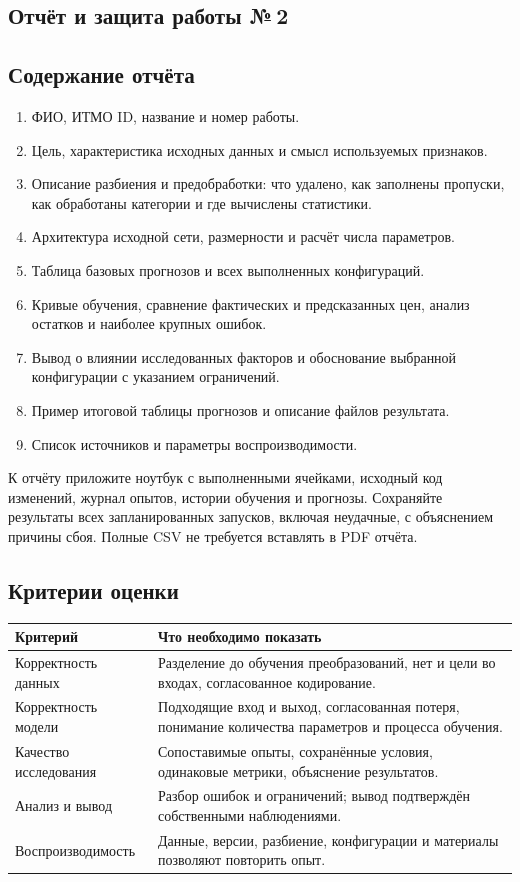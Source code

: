 \clearpage\subsection{Отчёт и защита работы №\,2}
\subsection*{Содержание отчёта}
\begin{enumerate}
\item ФИО, ИТМО ID, название и номер работы.
\item Цель, характеристика исходных данных и смысл используемых признаков.
\item Описание разбиения и предобработки: что удалено, как заполнены
пропуски, как обработаны категории и где вычислены статистики.
\item Архитектура исходной сети, размерности и расчёт числа параметров.
\item Таблица базовых прогнозов и всех выполненных конфигураций.
\item Кривые обучения, сравнение фактических и предсказанных цен,
анализ остатков и наиболее крупных ошибок.
\item Вывод о влиянии исследованных факторов и обоснование выбранной
конфигурации с указанием ограничений.
\item Пример итоговой таблицы прогнозов и описание файлов результата.
\item Список источников и параметры воспроизводимости.
\end{enumerate}

К отчёту приложите ноутбук с выполненными ячейками, исходный код изменений,
журнал опытов, истории обучения и прогнозы. Сохраняйте результаты всех
запланированных запусков, включая неудачные, с объяснением причины сбоя.
Полные CSV не требуется вставлять в PDF отчёта.

\subsection*{Критерии оценки}
\noindent\begin{tabularx}{\textwidth}{@{}p{}Y@{}}
\toprule
Критерий & Что необходимо показать \\
\midrule
Корректность данных & Разделение до обучения преобразований,
нет  и цели во входах, согласованное кодирование. \\
Корректность модели & Подходящие вход и выход, согласованная потеря,
понимание количества параметров и процесса обучения. \\
Качество исследования & Сопоставимые опыты, сохранённые условия,
одинаковые метрики, объяснение результатов. \\
Анализ и вывод & Разбор ошибок и ограничений; вывод подтверждён
собственными наблюдениями. \\
Воспроизводимость & Данные, версии, разбиение, конфигурации и материалы
позволяют повторить опыт. \\
\bottomrule
\end{tabularx}

